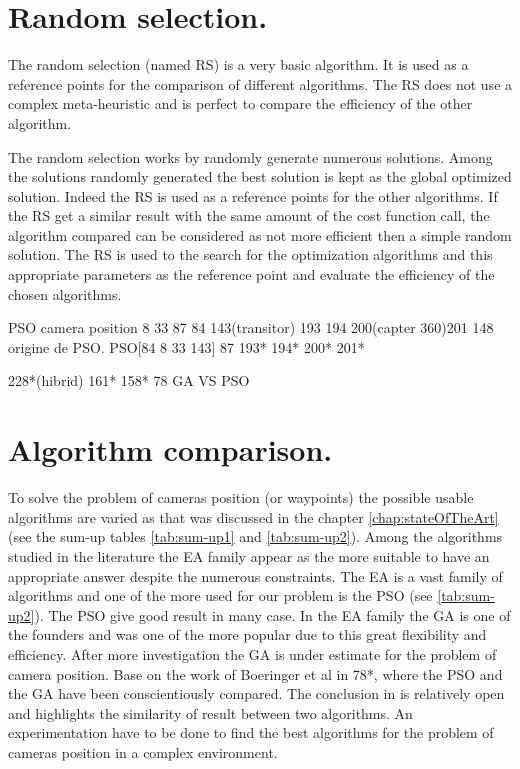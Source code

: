 \section{Random selection.}

The random selection (named RS) is a very basic algorithm. It is used as a reference points for the comparison of different algorithms. The RS does not use a complex meta-heuristic and is perfect to compare the efficiency of the other algorithm.

The random selection works by randomly generate numerous solutions. Among the solutions randomly generated the best solution is kept as the global optimized solution.
Indeed the RS is used as a reference points for the other algorithms. If the RS get a similar result with the same amount of the cost function call, the algorithm compared can be considered as not more efficient then a simple random solution. 
The RS is used to the search for the optimization algorithms and this appropriate parameters as the reference point and evaluate the efficiency of the chosen algorithms.


  

PSO camera position 
8 33 87 84 143(transitor) 193 194 200(capter 360)201
148 origine de PSO. 
PSO[84 8 33 143] 87 193* 194* 200* 201* 

228*(hibrid) 161* 158* 78 GA VS PSO

\section{Algorithm comparison.}\label{sec:GAvsPSO} 
%
To solve the problem of cameras position (or waypoints) the possible usable algorithms are varied as that was discussed in the chapter \ref{chap:stateOfTheArt} (see the sum-up tables \ref{tab:sum-up1} and \ref{tab:sum-up2}).
Among the algorithms studied in the literature the EA family appear as the more suitable to have an appropriate answer despite the numerous constraints. The EA is a vast family of algorithms and one of the more used for our problem is the PSO (see \ref{tab:sum-up2}). The PSO give good result in many case. In the EA family the GA is one of the founders and was one of the more popular due to this great flexibility and efficiency.
 After more investigation the GA is under estimate for the problem of camera position.
 Base on the work of Boeringer et al in \citep{78*boeringer2004}78*, where the PSO and the GA have been conscientiously compared. The conclusion in \citep{78*boeringer2004} is relatively open and highlights the similarity of result between two algorithms. An experimentation have to be done to find the best algorithms for the problem of cameras position in a complex environment. 



